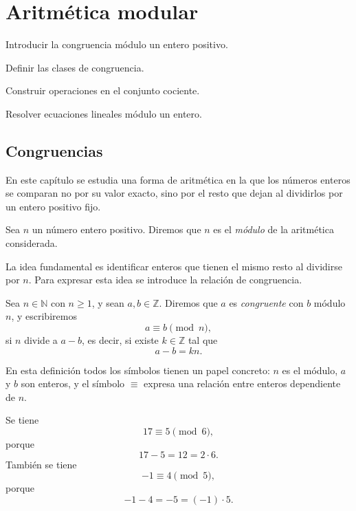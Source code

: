 \chapter{Aritmética modular}

\begin{objetivos}
  \item Introducir la congruencia módulo un entero positivo.
  \item Definir las clases de congruencia.
  \item Construir operaciones en el conjunto cociente.
  \item Resolver ecuaciones lineales módulo un entero.
\end{objetivos}

\section{Congruencias}

En este capítulo se estudia una forma de aritmética en la que los números enteros se comparan no por su valor exacto, sino por el resto que dejan al dividirlos por un entero positivo fijo.

\begin{definicion}[Módulo]
Sea \(n\) un número entero positivo. Diremos que \(n\) es el \emph{módulo} de la aritmética considerada.
\end{definicion}

La idea fundamental es identificar enteros que tienen el mismo resto al dividirse por \(n\). Para expresar esta idea se introduce la relación de congruencia.

\begin{definicion}
Sea \(n\in\mathbb{N}\) con \(n\geq 1\), y sean \(a,b\in\mathbb{Z}\). Diremos que \(a\) es \emph{congruente} con \(b\) módulo \(n\), y escribiremos
\[
  a \equiv b \pmod n,
\]
si \(n\) divide a \(a-b\), es decir, si existe \(k\in\mathbb{Z}\) tal que
\[
  a-b = kn.
\]
\end{definicion}

En esta definición todos los símbolos tienen un papel concreto: \(n\) es el módulo, \(a\) y \(b\) son enteros, y el símbolo \(\equiv\) expresa una relación entre enteros dependiente de \(n\).

\begin{ejemplo}
Se tiene
\[
  17 \equiv 5 \pmod 6,
\]
porque
\[
  17-5=12=2\cdot 6.
\]
También se tiene
\[
  -1 \equiv 4 \pmod 5,
\]
porque
\[
  -1-4=-5=(-1)\cdot 5.
\]
\end{ejemplo}

